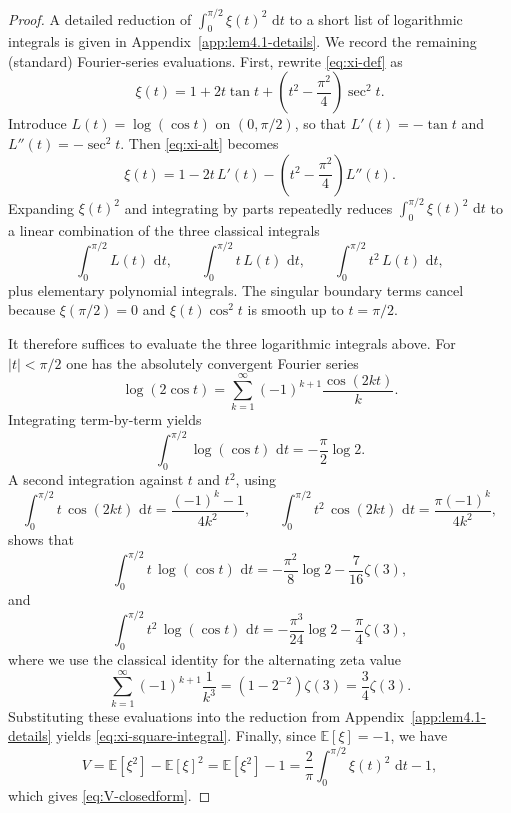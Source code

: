 \documentclass[11pt]{article}
\newcommand{\E}{\mathbb{E}}
\newcommand{\dd}{\,\mathrm{d}}
\begin{document}
\begin{proof}
A detailed reduction of $\int_0^{\pi/2}\xi(t)^2\,\dd t$ to a short list of logarithmic integrals is given in Appendix~\ref{app:lem4.1-details}.
We record the remaining (standard) Fourier-series evaluations.
First, rewrite \eqref{eq:xi-def} as
\begin{equation}
\label{eq:xi-alt}
\xi(t) = 1 + 2t\tan t + \left(t^2-\frac{\pi^2}{4}\right)\sec^2 t.
\end{equation}
Introduce $L(t)=\log(\cos t)$ on $(0,\pi/2)$, so that $L'(t)=-\tan t$ and $L''(t)=-\sec^2 t$.
Then \eqref{eq:xi-alt} becomes
\begin{equation}
\xi(t)=1-2t\,L'(t)-\left(t^2-\frac{\pi^2}{4}\right)L''(t).
\end{equation}
Expanding $\xi(t)^2$ and integrating by parts repeatedly reduces $\int_0^{\pi/2}\xi(t)^2\,\dd t$ to a linear combination of the three classical integrals
\begin{equation}
\int_0^{\pi/2} L(t)\,\dd t,
\qquad
\int_0^{\pi/2} t\,L(t)\,\dd t,
\qquad
\int_0^{\pi/2} t^2\,L(t)\,\dd t,
\end{equation}
plus elementary polynomial integrals.
The singular boundary terms cancel because $\xi(\pi/2)=0$ and $\xi(t)\cos^2 t$ is smooth up to $t=\pi/2$.

It therefore suffices to evaluate the three logarithmic integrals above.
For $|t|<\pi/2$ one has the absolutely convergent Fourier series
\begin{equation}
\label{eq:logcos-fourier}
\log(2\cos t)=\sum_{k=1}^{\infty}(-1)^{k+1}\frac{\cos(2kt)}{k}.
\end{equation}
Integrating term-by-term yields
\begin{equation}
\int_0^{\pi/2} \log(\cos t)\,\dd t = -\frac{\pi}{2}\log 2.
\end{equation}
A second integration against $t$ and $t^2$, using
\begin{equation}
\int_0^{\pi/2} t\,\cos(2kt)\,\dd t = \frac{(-1)^k-1}{4k^2},
\qquad
\int_0^{\pi/2} t^2\,\cos(2kt)\,\dd t = \frac{\pi(-1)^k}{4k^2},
\end{equation}
shows that
\begin{equation}
\int_0^{\pi/2} t\,\log(\cos t)\,\dd t
=
-\frac{\pi^2}{8}\log 2-\frac{7}{16}\zeta(3),
\end{equation}
and
\begin{equation}
\int_0^{\pi/2} t^2\,\log(\cos t)\,\dd t
=
-\frac{\pi^3}{24}\log 2-\frac{\pi}{4}\zeta(3),
\end{equation}
where we use the classical identity for the alternating zeta value
\begin{equation}
\sum_{k=1}^{\infty}(-1)^{k+1}\frac{1}{k^3}=\left(1-2^{-2}\right)\zeta(3)=\frac{3}{4}\zeta(3).
\end{equation}
Substituting these evaluations into the reduction from Appendix~\ref{app:lem4.1-details} yields \eqref{eq:xi-square-integral}.
Finally, since $\E[\xi]=-1$, we have
\begin{equation}
V=\E[\xi^2]-\E[\xi]^2=\E[\xi^2]-1
=
\frac{2}{\pi}\int_0^{\pi/2}\xi(t)^2\,\dd t-1,
\end{equation}
which gives \eqref{eq:V-closedform}.
\end{proof}
\end{document}
